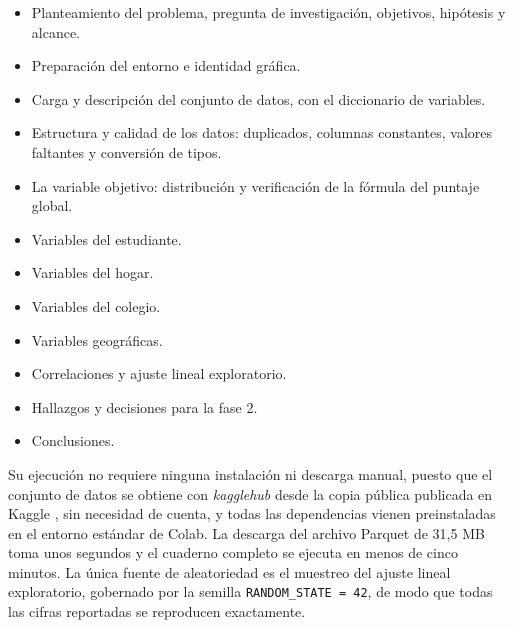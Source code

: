     \begin{itemize}
        \item Planteamiento del problema, pregunta de investigación, objetivos,
        hipótesis y alcance.

        \item Preparación del entorno e identidad gráfica.

        \item Carga y descripción del conjunto de datos, con el diccionario de
        variables.

        \item Estructura y calidad de los datos: duplicados, columnas constantes,
        valores faltantes y conversión de tipos.

        \item La variable objetivo: distribución y verificación de la fórmula del
        puntaje global.

        \item Variables del estudiante.

        \item Variables del hogar.

        \item Variables del colegio.

        \item Variables geográficas.

        \item Correlaciones y ajuste lineal exploratorio.

        \item Hallazgos y decisiones para la fase 2.

        \item Conclusiones.
    \end{itemize}

    \vspace{10pt}

    Su ejecución no requiere ninguna instalación ni descarga manual, puesto que el
    conjunto de datos se obtiene con \textit{kagglehub} desde la copia pública
    publicada en Kaggle \cite{rubiano2026kaggle}, sin necesidad de cuenta, y todas
    las dependencias vienen preinstaladas en el entorno estándar de Colab. La
    descarga del archivo Parquet de 31,5 MB toma unos segundos y el cuaderno
    completo se ejecuta en menos de cinco minutos. La única fuente de aleatoriedad es el
    muestreo del ajuste lineal exploratorio, gobernado por la semilla
    \texttt{RANDOM\_STATE = 42}, de modo que todas las cifras reportadas se
    reproducen exactamente.
